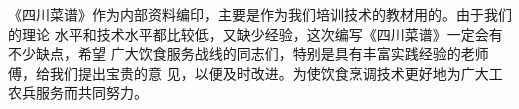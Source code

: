 《四川菜谱》作为内部资料编印，主要是作为我们培训技术的教材用的。由于我们的理论
水平和技术水平都比较低，又缺少经验，这次编写《四川菜谱》一定会有不少缺点，希望
广大饮食服务战线的同志们，特别是具有丰富实践经验的老师傅，给我们提出宝贵的意
见，以便及时改进。为使饮食烹调技术更好地为广大工农兵服务而共同努力。

\vspace{-.335823\baselineskip}
\begin{flushright}
\end{flushright}

